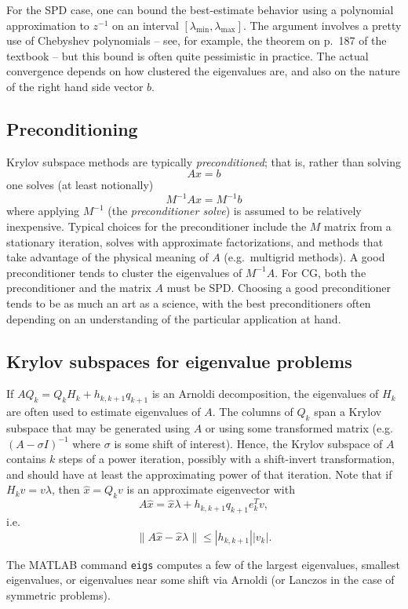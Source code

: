 \documentclass[12pt, leqno]{article}
\begin{document}
For the SPD case, one can bound the best-estimate behavior using a polynomial
approximation to $z^{-1}$ on an interval $[\lambda_{\min}, \lambda_{\max}]$.
The argument involves a pretty use of Chebyshev polynomials -- see,
for example, the theorem on p.~187 of the textbook -- but this bound
is often quite pessimistic in practice.  The actual convergence
depends on how clustered the eigenvalues are, and also on the nature
of the right hand side vector $b$.

\subsection{Preconditioning}

Krylov subspace methods are typically {\em preconditioned}; that is,
rather than solving
\[
  Ax = b
\]
one solves (at least notionally)
\[
  M^{-1} A x = M^{-1} b
\]
where applying $M^{-1}$ (the {\em preconditioner solve}) is assumed to
be relatively inexpensive.  Typical choices for the preconditioner
include the $M$ matrix from a stationary iteration, solves with
approximate factorizations, and methods that take advantage of
the physical meaning of $A$ (e.g.~multigrid methods).  A good
preconditioner tends to cluster the eigenvalues of $M^{-1} A$.
For CG, both the preconditioner and the matrix $A$ must be SPD.
Choosing a good preconditioner tends to be as much an art as a
science, with the best preconditioners often depending on an
understanding of the particular application at hand.

\subsection{Krylov subspaces for eigenvalue problems}

If $A Q_k = Q_k H_k + h_{k,k+1} q_{k+1}$ is an Arnoldi decomposition,
the eigenvalues of $H_k$ are often used to estimate eigenvalues of
$A$.  The columns of $Q_k$ span a Krylov subspace that may be
generated using $A$ or using some transformed matrix (e.g.
$(A-\sigma I)^{-1}$ where $\sigma$ is some shift of interest).
Hence, the Krylov subspace of $A$ contains $k$ steps of a power
iteration, possibly with a shift-invert transformation, and should
have at least the approximating power of that iteration.
Note that if $H_k v = v \lambda$, then $\hat{x} = Q_k v$ is an
approximate eigenvector with
\[
  A \hat{x} = \hat{x} \lambda + h_{k,k+1} q_{k+1} e_k^T v,
\]
i.e.
\[
  \|A \hat{x}-\hat{x} \lambda\| \leq |h_{k,k+1}| |v_k|.
\]

The MATLAB command {\tt eigs} computes a few of the largest
eigenvalues, smallest eigenvalues, or eigenvalues near some shift
via Arnoldi (or Lanczos in the case of symmetric problems).
\end{document}
